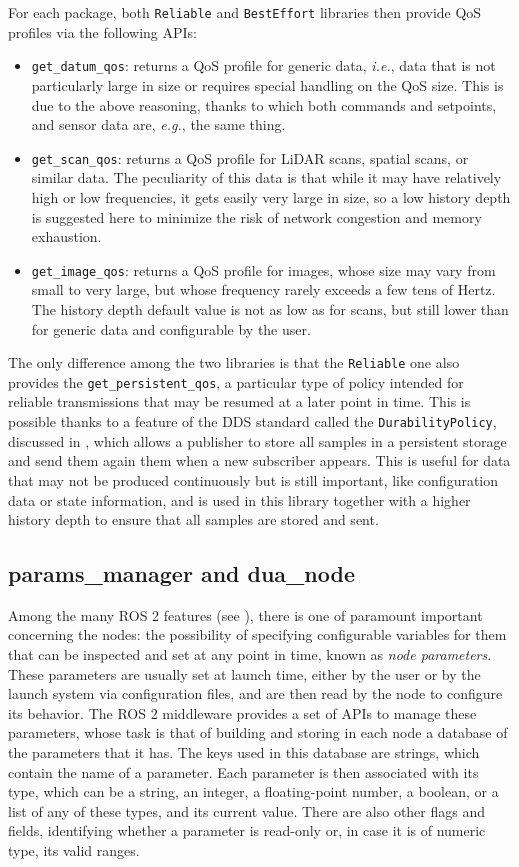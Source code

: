 For each package, both \texttt{Reliable} and \texttt{BestEffort} libraries then provide QoS profiles via the following APIs:
\begin{itemize}
  \item \texttt{get\_datum\_qos}: returns a QoS profile for generic data, \emph{i.e.}, data that is not particularly large in size or requires special handling on the QoS size. This is due to the above reasoning, thanks to which both commands and setpoints, and sensor data are, \emph{e.g.}, the same thing.
  \item \texttt{get\_scan\_qos}: returns a QoS profile for LiDAR scans, spatial scans, or similar data. The peculiarity of this data is that while it may have relatively high or low frequencies, it gets easily very large in size, so a low history depth is suggested here to minimize the risk of network congestion and memory exhaustion.
  \item \texttt{get\_image\_qos}: returns a QoS profile for images, whose size may vary from small to very large, but whose frequency rarely exceeds a few tens of Hertz. The history depth default value is not as low as for scans, but still lower than for generic data and configurable by the user.
\end{itemize}
The only difference among the two libraries is that the \texttt{Reliable} one also provides the \texttt{get\_persistent\_qos}, a particular type of policy intended for reliable transmissions that may be resumed at a later point in time. This is possible thanks to a feature of the DDS standard called the \texttt{DurabilityPolicy}, discussed in , which allows a publisher to store all samples in a persistent storage and send them again them when a new subscriber appears. This is useful for data that may not be produced continuously but is still important, like configuration data or state information, and is used in this library together with a higher history depth to ensure that all samples are stored and sent.

\subsection{params\_manager and dua\_node}
\label{sec:params_manager_dua_node}
Among the many ROS 2 features (see ), there is one of paramount important concerning the nodes: the possibility of specifying configurable variables for them that can be inspected and set at any point in time, known as \emph{node parameters}. These parameters are usually set at launch time, either by the user or by the launch system via configuration files, and are then read by the node to configure its behavior. The ROS 2 middleware provides a set of APIs to manage these parameters, whose task is that of building and storing in each node a database of the parameters that it has. The keys used in this database are strings, which contain the name of a parameter. Each parameter is then associated with its type, which can be a string, an integer, a floating-point number, a boolean, or a list of any of these types, and its current value. There are also other flags and fields, identifying whether a parameter is read-only or, in case it is of numeric type, its valid ranges.

